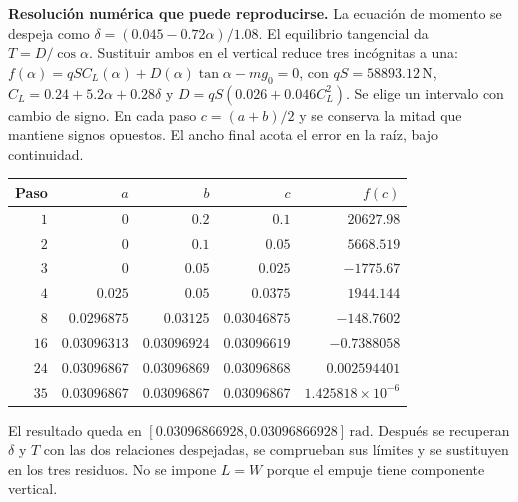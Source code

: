 \textbf{Resolución numérica que puede reproducirse.} La ecuación de momento se despeja como $\delta=(0.045-0.72\alpha)/1.08$. El equilibrio tangencial da $T=D/\cos\alpha$. Sustituir ambos en el vertical reduce tres incógnitas a una: $f(\alpha)=qSC_L(\alpha)+D(\alpha)\tan\alpha-mg_0=0$, con $qS=58893.12\,\mathrm N$, $C_L=0.24+5.2\alpha+0.28\delta$ y $D=qS(0.026+0.046C_L^2)$. Se elige un intervalo con cambio de signo. En cada paso $c=(a+b)/2$ y se conserva la mitad que mantiene signos opuestos. El ancho final acota el error en la raíz, bajo continuidad.
\begin{center}\begin{tabular}{rrrrr}
\toprule Paso & $a$ & $b$ & $c$ & $f(c)$\\\midrule
$1$ & $0$ & $0.2$ & $0.1$ & $20627.98$\\
$2$ & $0$ & $0.1$ & $0.05$ & $5668.519$\\
$3$ & $0$ & $0.05$ & $0.025$ & $-1775.67$\\
$4$ & $0.025$ & $0.05$ & $0.0375$ & $1944.144$\\
$8$ & $0.0296875$ & $0.03125$ & $0.03046875$ & $-148.7602$\\
$16$ & $0.03096313$ & $0.03096924$ & $0.03096619$ & $-0.7388058$\\
$24$ & $0.03096867$ & $0.03096869$ & $0.03096868$ & $0.002594401$\\
$35$ & $0.03096867$ & $0.03096867$ & $0.03096867$ & $1.425818\times10^{-6}$\\
\bottomrule\end{tabular}\end{center}
El resultado queda en $[0.03096866928,0.03096866928]\,\mathrm{rad}$. Después se recuperan $\delta$ y $T$ con las dos relaciones despejadas, se comprueban sus límites y se sustituyen en los tres residuos. No se impone $L=W$ porque el empuje tiene componente vertical.

